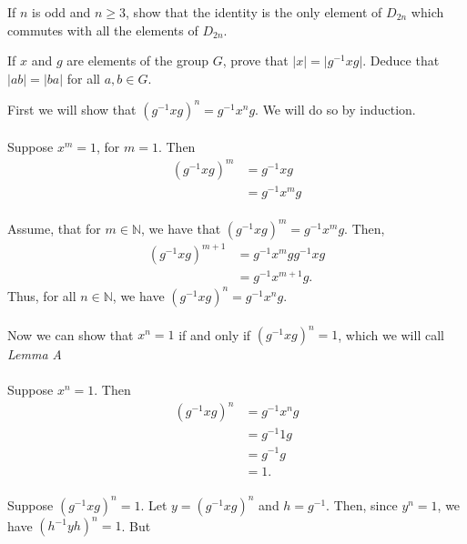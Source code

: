 \documentclass[12 pt, letterpaper]{hmcpset}
\begin{document}
\pagebreak

\begin{problem}
	If $n$ is odd and $n \ge 3$, show that the identity is the only element of $D_{2n}$ which commutes with all the elements of $D_{2n}$.
\end{problem}

\pagebreak

\begin{problem}
	If $x$ and $g$ are elements of the group $G$, prove that $\lvert x \rvert = \vert g^{-1} x g \rvert$. Deduce that $\lvert a b \rvert = \lvert b a \rvert$ for all $a, b \in G$.
\end{problem}

\begin{solution}
	First we will show that $(g^{-1} x g)^n = g^{-1} x^n g$. We will do so by induction. \\\\
	Suppose $x^m = 1$, for $m = 1$. Then
	\[
		\begin{split}
			(g^{-1} x g)^m & = g^{-1} x g \\
				       & = g^{-1} x^m g
		\end{split}
	\] \\
	Assume, that for $m \in \mathbb N$, we have that $(g^{-1} x g)^m = g^{-1} x^m g$. Then,
	\[
		\begin{split}
			(g^{-1} x g)^{m + 1} & =  g^{-1} x^m g g^{-1} x g \\
					     & = g^{-1} x^{m + 1} g.
		\end{split}
	\]
	Thus, for all $n \in \mathbb N$, we have $(g^{-1} x g)^n = g^{-1} x^n g$. \\\\
	Now we can show that $x^n = 1$ if and only if $(g^{-1} x g)^n = 1$, which we will call \textit{Lemma A} \\\\
	Suppose $x^n = 1$. Then
	\[
		\begin{split}
			(g^{-1} x g)^n & = g^{-1} x^n g \\
				       & = g^{-1} 1 g \\
				       & = g^{-1} g \\
				       & = 1.
		\end{split}
	\] \\
	Suppose $(g^{-1} x g)^n = 1$. Let $y = (g^{-1} x g)^n$ and $h = g^{-1}$. Then, since $y^n = 1$, we have $(h^{-1} y h)^n = 1$. But
	\[
		\begin{split}

\end{split}\]
\end{solution}
\end{document}
